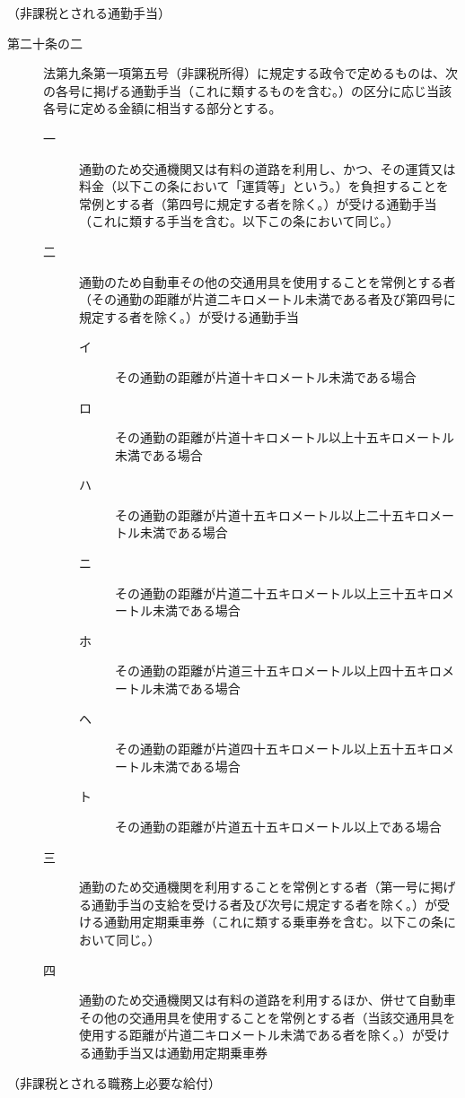 \documentclass[twocolumn,a4j,10pt]{ltjtarticle}
\begin{document}
\noindent\hspace{10pt}（非課税とされる通勤手当）
\begin{description}
\item[第二十条の二]法第九条第一項第五号（非課税所得）に規定する政令で定めるものは、次の各号に掲げる通勤手当（これに類するものを含む。）の区分に応じ当該各号に定める金額に相当する部分とする。
\begin{description}
\item[一]通勤のため交通機関又は有料の道路を利用し、かつ、その運賃又は料金（以下この条において「運賃等」という。）を負担することを常例とする者（第四号に規定する者を除く。）が受ける通勤手当（これに類する手当を含む。以下この条において同じ。）
\item[二]通勤のため自動車その他の交通用具を使用することを常例とする者（その通勤の距離が片道二キロメートル未満である者及び第四号に規定する者を除く。）が受ける通勤手当
\begin{description}
\item[イ]その通勤の距離が片道十キロメートル未満である場合
\item[ロ]その通勤の距離が片道十キロメートル以上十五キロメートル未満である場合
\item[ハ]その通勤の距離が片道十五キロメートル以上二十五キロメートル未満である場合
\item[ニ]その通勤の距離が片道二十五キロメートル以上三十五キロメートル未満である場合
\item[ホ]その通勤の距離が片道三十五キロメートル以上四十五キロメートル未満である場合
\item[ヘ]その通勤の距離が片道四十五キロメートル以上五十五キロメートル未満である場合
\item[ト]その通勤の距離が片道五十五キロメートル以上である場合
\end{description}
\item[三]通勤のため交通機関を利用することを常例とする者（第一号に掲げる通勤手当の支給を受ける者及び次号に規定する者を除く。）が受ける通勤用定期乗車券（これに類する乗車券を含む。以下この条において同じ。）
\item[四]通勤のため交通機関又は有料の道路を利用するほか、併せて自動車その他の交通用具を使用することを常例とする者（当該交通用具を使用する距離が片道二キロメートル未満である者を除く。）が受ける通勤手当又は通勤用定期乗車券
\end{description}
\end{description}
\noindent\hspace{10pt}（非課税とされる職務上必要な給付）
\end{document}
